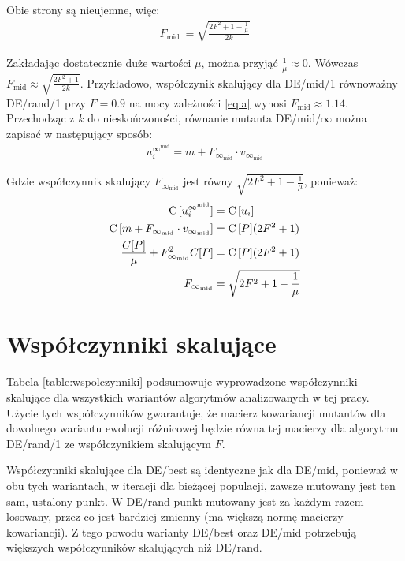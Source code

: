 \documentclass[a4paper,onecolumn,oneside,12pt,wide,floatssmall]{mwrep}
\def\C{{\rm C}\,}
\theoremstyle{definition}
\theoremstyle{plain}%
\theoremstyle{remark}
\begin{document}
Obie strony są nieujemne, więc:
\begin{align} \label{eq:a}
F_\text{mid}\ = \sqrt{\frac{2F^2 + 1 - \frac{1}{\mu}}{2k}}
\end{align}

Zakładając dostatecznie duże wartości $\mu$, można przyjąć $\frac{1}{\mu} \approx 0$.
Wówczas \mbox{$F_\text{mid} \approx \sqrt{\frac{2F^2 + 1}{2k}}$}.
Przykładowo, współczynik skalujący dla DE/mid/1 równoważny DE/rand/1 przy $F = 0.9$ 
na mocy zależności \eqref{eq:a} wynosi $F_\text{mid} \approx 1.14$. \\

Przechodząc z $k$ do nieskończoności, równanie mutanta DE/mid/$\infty$ można zapisać
w następujący sposób:
\begin{align*}
u_i^{\infty^\text{mid}} = m + F_{\infty_\text{mid}} \cdot v_{\infty_\text{mid}}
\end{align*}

Gdzie współczynnik skalujący $F_{\infty_\text{mid}}$ jest równy $\sqrt{2F^2 + 1 - \frac{1}{\mu}}$, ponieważ:
\begin{align*}
\C[u_i^{\infty^\text{mid}}] &= \C[u_i] \\
\C[m + F_{\infty_\text{mid}} \cdot v_{\infty_\text{mid}}] &= \C[P](2F^2 + 1) \\
\frac{C[P]}{\mu} + F_{\infty_\text{mid}}^2 C[P] &= \C[P](2F^2 + 1) \\
F_{\infty_\text{mid}} &= \sqrt{2F^2 + 1 - \frac{1}{\mu}}
\end{align*}

\section{Współczynniki skalujące}

Tabela \ref{table:wspolczynniki} podsumowuje wyprowadzone współczynniki skalujące dla wszystkich
wariantów algorytmów analizowanych w tej pracy. Użycie tych współczynników gwarantuje, że macierz
kowariancji mutantów dla dowolnego wariantu ewolucji różnicowej będzie równa tej macierzy dla algorytmu
DE/rand/1 ze współczynikiem skalującym $F$.

Współczynniki skalujące dla DE/best są identyczne jak dla DE/mid, ponieważ w obu tych wariantach,
w iteracji dla bieżącej populacji, zawsze mutowany jest ten sam, ustalony punkt. 
W DE/rand punkt mutowany jest za każdym razem losowany, 
przez co jest bardziej zmienny (ma większą normę macierzy kowariancji).
Z tego powodu warianty DE/best oraz DE/mid potrzebują większych współczynników skalujących niż DE/rand.
\end{document}
